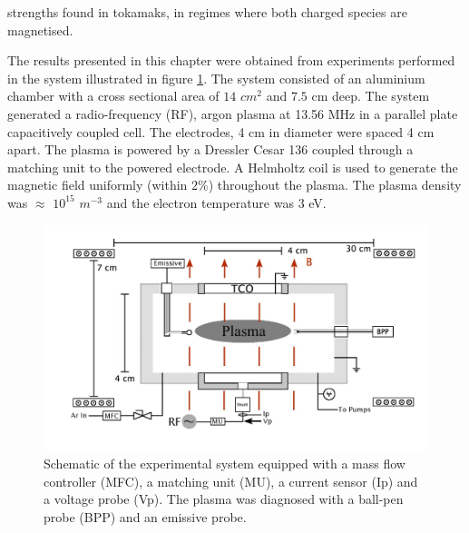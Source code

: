 strengths found in tokamaks, in regimes where both charged species are magnetised.


The results presented in this chapter were obtained from experiments performed in the system illustrated in figure \ref{fig:rig}. The system consisted of an aluminium chamber with a cross sectional area of $14$ $cm^2$ and $7.5$ cm deep. The system generated a radio-frequency (RF), argon plasma at 13.56 MHz in a parallel plate capacitively coupled cell. The electrodes, 4 cm in diameter were spaced 4 cm apart. The plasma is powered by a Dressler Cesar 136 coupled through a matching unit to the powered electrode. A Helmholtz coil is used to generate the magnetic field uniformly (within $2\%$) throughout the plasma. The plasma density was $\approx$ $10^{15}$ $m^{-3}$ and the electron temperature was $3$ eV. 


\begin{figure}[H]
\centering
\includegraphics[width=1.0\textwidth]{ChamberSchematic4.jpg}
\caption{Schematic of the experimental system equipped with a mass flow controller (MFC), a matching unit (MU), a current sensor (Ip) and a voltage probe (Vp). The plasma was diagnosed with a ball-pen probe (BPP) and an emissive probe.}
\label{fig:rig}
\end{figure}


